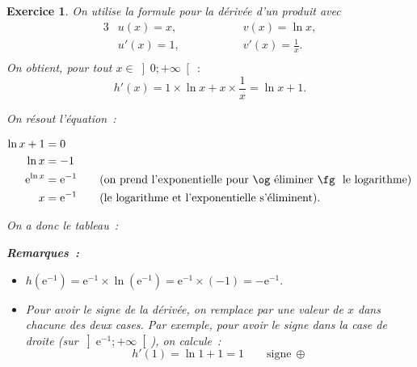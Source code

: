 \documentclass[10pt]{article}
\newtheorem{exo}{Exercice}
\begin{document}
\begin{exo}


On utilise la formule pour la dérivée d'un produit avec
\begin{alignat*}{3}
&u(x)=x,&& \hspace{1cm}&&v(x)=\ln x, \\
& u'(x)=1,&& &&v'(x)=\frac{1}{x}.\\
\end{alignat*}
On obtient, pour tout $x\in \left]0;+\infty\right[~:$
\[h'(x)=1\times \ln x+x\times \frac{1}{x}=\ln x+1.\]

On résout l'équation~:

\begin{align*}
\ln x+1&=0\\
\ln x&=-1\\
\text{e}^{\ln x}&=\text{e}^{-1}\qquad\text{(on prend l'exponentielle pour \og éliminer \fg~{} le logarithme)}\\
x&=\text{e}^{-1}\qquad \text{(le logarithme et l'exponentielle s'éliminent)}.
\end{align*}


On a donc le tableau~:

\medskip
\begin{center}
\end{center}

\medskip

\textbf{Remarques~:}

\begin{itemize}
\item[\textbullet] $h\left(\text{e}^{-1}\right)=\text{e}^{-1}\times \ln \left(\text{e}^{-1}\right)=\text{e}^{-1}\times(-1)=-\text{e}^{-1}.$
\item[\textbullet] Pour avoir le signe de la dérivée, on remplace par une valeur de $x$ dans chacune des deux cases. Par exemple, pour avoir le signe dans la case de droite (sur $\left]\text{e}^{-1};+\infty\right[$), on calcule~:
\[h'(1)=\ln 1+1=1\qquad \text{signe} ~\oplus\] 
\end{itemize}

\end{exo}
\end{document}
